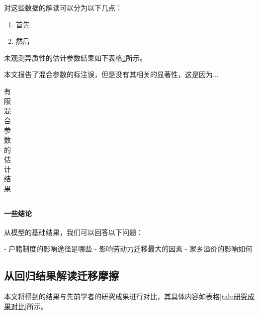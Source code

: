 \documentclass[
  a4paper,
  zihao=-4,
  fontset=mac,
  AutoFakeBold,
  AutoFakeSlant,
  oneside]{ctexbook}
\begin{document}
对这些数据的解读可以分为以下几点：
\begin{enumerate}
  \item 首先
  \item 然后
\end{enumerate}



未观测异质性的估计参数结果如下表格\ref{tab:有限混合参数的估计结果}所示。

本文报告了混合参数的标注误，但是没有其相关的显著性，这是因为...






\begin{table}[!ht]
\centering
\caption{有限混合参数的估计结果}
\begin{tabularx}{\textwidth}{@{}cXXX@{}}
\toprule
\midrule
\bottomrule
\end{tabularx}
\label{tab:有限混合参数的估计结果}
\end{table}




\paragraph{一些结论}

从模型的基础结果，我们可以回答以下问题：

- 户籍制度的影响途径是哪些
- 影响劳动力迁移最大的因素
- 家乡溢价的影响如何


\subsection{从回归结果解读迁移摩擦}
本文将得到的结果与先前学者的研究成果进行对比，其具体内容如表格\ref{tab:研究成果对比}所示。
\end{document}
